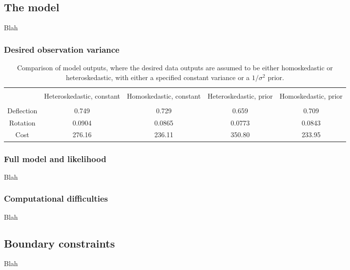 \documentclass{article}
\begin{document}
\subsection{The model}
Blah

\subsubsection{Desired observation variance}
\begin{table}[h]
\centering
\begin{tabular}{| c | c  |  c  | c |  c  |}
\hline
 \vspace{-3mm}
& & & & \\
& \parbox{24mm}{\centering Heteroskedastic, constant}& \parbox{24mm}{\centering Homoskedastic, constant}& \parbox{24mm}{\centering Heteroskedastic, prior} & \parbox{24mm}{\centering Homoskedastic, prior}\\
 \vspace{-3.5mm}
& & & & \\
\hline
Deflection & 0.749 & 0.729 & 0.659 & 0.709\\
Rotation & 0.0904 & 0.0865 & 0.0773 & 0.0843\\
Cost & 276.16 & 236.11 & 350.80 & 233.95 \\
\hline
\end{tabular}
\caption{Comparison of model outputs, where the desired data outputs are assumed to be either homoskedastic or heteroskedastic, with either a specified constant variance or a $1/\sigma^2$ prior.}
\label{table:obs_var_comp}
\end{table}

\subsubsection{Full model and likelihood}
Blah

\subsubsection{Computational difficulties}
Blah

\subsection{Boundary constraints}
Blah
\end{document}

